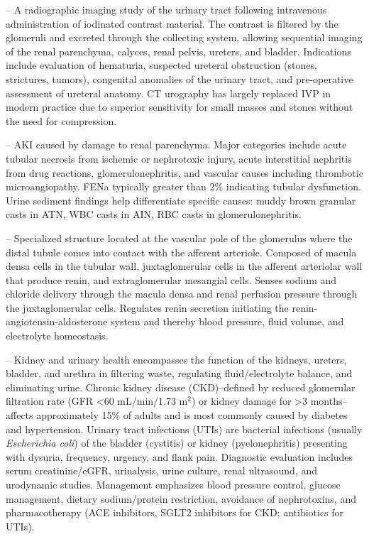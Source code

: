 -- A radiographic imaging study of the urinary tract following intravenous administration of iodinated contrast material. The contrast is filtered by the glomeruli and excreted through the collecting system, allowing sequential imaging of the renal parenchyma, calyces, renal pelvis, ureters, and bladder. Indications include evaluation of hematuria, suspected ureteral obstruction (stones, strictures, tumors), congenital anomalies of the urinary tract, and pre-operative assessment of ureteral anatomy. CT urography has largely replaced IVP in modern practice due to superior sensitivity for small masses and stones without the need for compression.

-- AKI caused by damage to renal parenchyma. Major categories include acute tubular necrosis from ischemic or nephrotoxic injury, acute interstitial nephritis from drug reactions, glomerulonephritis, and vascular causes including thrombotic microangiopathy. FENa typically greater than 2\% indicating tubular dysfunction. Urine sediment findings help differentiate specific causes: muddy brown granular casts in ATN, WBC casts in AIN, RBC casts in glomerulonephritis.

-- Specialized structure located at the vascular pole of the glomerulus where the distal tubule comes into contact with the afferent arteriole. Composed of macula densa cells in the tubular wall, juxtaglomerular cells in the afferent arteriolar wall that produce renin, and extraglomerular mesangial cells. Senses sodium and chloride delivery through the macula densa and renal perfusion pressure through the juxtaglomerular cells. Regulates renin secretion initiating the renin-angiotensin-aldosterone system and thereby blood pressure, fluid volume, and electrolyte homeostasis.

-- Kidney and urinary health encompasses the function of the kidneys, ureters, bladder, and urethra in filtering waste, regulating fluid/electrolyte balance, and eliminating urine. Chronic kidney disease (CKD)--defined by reduced glomerular filtration rate (GFR <60 mL/min/1.73 m$^2$) or kidney damage for >3 months--affects approximately 15\% of adults and is most commonly caused by diabetes and hypertension. Urinary tract infections (UTIs) are bacterial infections (usually \emph{Escherichia coli}) of the bladder (cystitis) or kidney (pyelonephritis) presenting with dysuria, frequency, urgency, and flank pain. Diagnostic evaluation includes serum creatinine/eGFR, urinalysis, urine culture, renal ultrasound, and urodynamic studies. Management emphasizes blood pressure control, glucose management, dietary sodium/protein restriction, avoidance of nephrotoxins, and pharmacotherapy (ACE inhibitors, SGLT2 inhibitors for CKD; antibiotics for UTIs).

